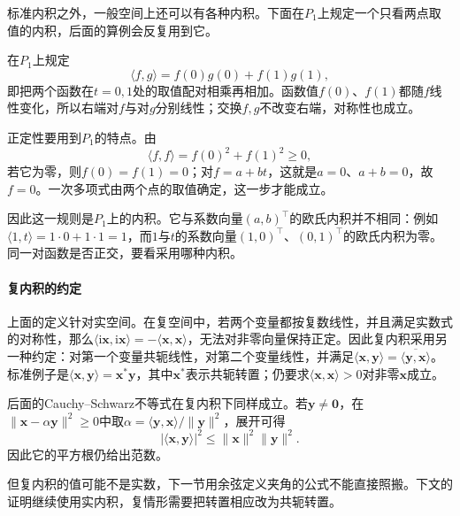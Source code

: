 标准内积之外，一般空间上还可以有各种内积。下面在$P_1$上规定一个只看两点取值的内积，后面的算例会反复用到它。
\begin{example}[只看两点取值的内积]
\label{ex:ls-two-point-inner-product}
在$P_1$上规定
\[
 \langle f,g\rangle=f(0)g(0)+f(1)g(1),
\]
即把两个函数在$t=0,1$处的取值配对相乘再相加。函数值$f(0)$、$f(1)$都随$f$线性变化，所以右端对$f$与对$g$分别线性；交换$f,g$不改变右端，对称性也成立。

正定性要用到$P_1$的特点。由
\[
 \langle f,f\rangle=f(0)^2+f(1)^2\geq0,
\]
若它为零，则$f(0)=f(1)=0$；对$f=a+bt$，这就是$a=0$、$a+b=0$，故$f=0$。一次多项式由两个点的取值确定，这一步才能成立。

因此这一规则是$P_1$上的内积。它与系数向量$(a,b)^\top$的欧氏内积并不相同：例如$\langle1,t\rangle=1\cdot0+1\cdot1=1$，而$1$与$t$的系数向量$(1,0)^\top$、$(0,1)^\top$的欧氏内积为零。同一对函数是否正交，要看采用哪种内积。
\end{example}

\paragraph{复内积的约定}
上面的定义针对实空间。在复空间中，若两个变量都按复数线性，并且满足实数式的对称性，那么$\langle\mathrm i\bm x,\mathrm i\bm x\rangle=-\langle\bm x,\bm x\rangle$，无法对非零向量保持正定。因此复内积采用另一种约定：对第一个变量共轭线性，对第二个变量线性，并满足$\langle\bm x,\bm y\rangle=\overline{\langle\bm y,\bm x\rangle}$。标准例子是$\langle\bm x,\bm y\rangle=\bm x^*\bm y$，其中$\bm x^*$表示共轭转置；仍要求$\langle\bm x,\bm x\rangle>0$对非零$\bm x$成立。

后面的Cauchy--Schwarz不等式在复内积下同样成立。若$\bm y\ne\bm0$，在$\lVert\bm x-\alpha\bm y\rVert^2\geq0$中取$\alpha=\langle\bm y,\bm x\rangle/\lVert\bm y\rVert^2$，展开可得
\[
 |\langle\bm x,\bm y\rangle|^2\leq\lVert\bm x\rVert^2\lVert\bm y\rVert^2 .
\]
因此它的平方根仍给出范数。

但复内积的值可能不是实数，下一节用余弦定义夹角的公式不能直接照搬。下文的证明继续使用实内积，复情形需要把转置相应改为共轭转置。
